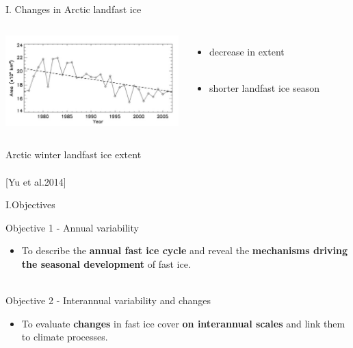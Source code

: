 \documentclass[8pt]{beamer}
\newcommand\Fontvi{\fontsize{6}{7.2}\selectfont}
\begin{document}
\setwatermark{\fontsize{125pt}{125pt}\selectfont{}}
\begin{frame}[fragile]{I. Changes in Arctic landfast ice}
	\begin{columns}
		\includegraphics[height=3.5cm]{./img/Extent_timeseries.png}\\
			\begin{itemize}
				\item decrease in extent\\~\\
				\item shorter landfast ice season
			\end{itemize}
	\end{columns}
Arctic winter landfast ice extent \\~\\
\Fontvi
[Yu et al.2014]
\end{frame}

\setwatermark{\fontsize{125pt}{125pt}\selectfont{}}
\begin{frame}[fragile]{I.Objectives}
		
	Objective 1 -  Annual variability
		\begin{itemize}
			\item To describe the \textbf{annual fast ice cycle} and 
		reveal the \textbf{mechanisms driving the seasonal development} of fast ice.\\~\\
		\end{itemize}
	Objective 2 - Interannual variability and changes
		\begin{itemize}
			\item To evaluate \textbf{changes} in fast ice cover \textbf{on interannual scales} and 
		link them to climate processes.
		\end{itemize}

\end{frame}
\end{document}
